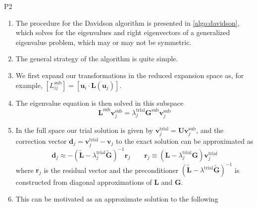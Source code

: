 \noindent
P2
\begin{enumerate}
    \item
        The procedure for the Davidson algorithm is presented in
        \cref{algo:davidson}, which solves for the eigenvalues and right
        eigenvectors of a generalized eigenvalue problem, which may or may not
        be symmetric.
    \item
        The general strategy of the algorithm is quite simple.
    \item
        We first expand our transformations in the reduced expansion space as,
        for example,
        \(
            [L_{ij}^\mathrm{sub}]
            =
            [\mathbf{u}_i\cdot \mathbf{L}(\mathbf{u}_j)]
        \).
    \item
        The eigenvalue equation is then solved in this subspace
        \begin{equation}
            \mathbf{L}^\mathrm{sub}
            \mathbf{v}_j^\mathrm{sub}
            =
            \lambda_j^\mathrm{trial}
            \mathbf{G}^\mathrm{sub}
            \mathbf{v}_j^\mathrm{sub}
        \end{equation}
    \item
        In the full space our trial solution is given by
        \(
            \mathbf{v}_j^\mathrm{trial}
            =
            \mathbf{U}\mathbf{v}_j^\mathrm{sub}
        \),
        and the correction vector
        \(
            \mathbf{d}_j
            =
            \mathbf{v}_j^\mathrm{trial}
            -
            \mathbf{v}_j
        \)
        to the exact solution can be approximated as
        \begin{equation}
            \mathbf{d}_j
            \approx
            -
            (
                \tilde{\mathbf{L}}
                -
                \lambda_j^\mathrm{trial}
                \tilde{\mathbf{G}}
            )^{-1}
            \mathbf{r}_j
            \qquad
            \mathbf{r}_j
            \equiv
            (\mathbf{L} - \lambda_j^\mathrm{trial}\mathbf{G})
            \mathbf{v}_j^\mathrm{trial}
        \end{equation}
        where \(\mathbf{r}_j\) is the residual vector and the preconditioner
        \(
            (
                \tilde{\mathbf{L}} - \lambda^\mathrm{trial}\tilde{\mathbf{G}}
            )^{-1}
        \)
        is constructed from diagonal approximations of \(\mathbf{L}\) and
        \(\mathbf{G}\).
    \item
        This can be motivated as an approximate solution to the following

\end{enumerate}
